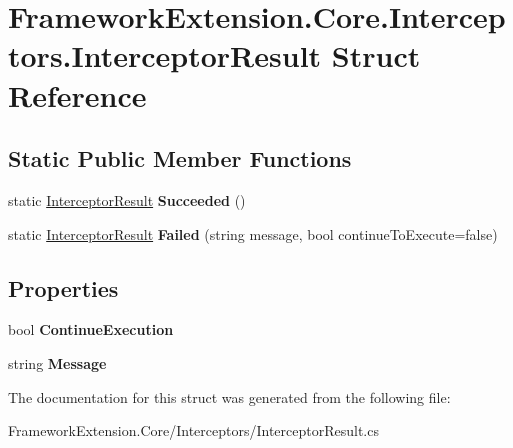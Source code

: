 \hypertarget{struct_framework_extension_1_1_core_1_1_interceptors_1_1_interceptor_result}{\section{Framework\-Extension.\-Core.\-Interceptors.\-Interceptor\-Result Struct Reference}
\label{struct_framework_extension_1_1_core_1_1_interceptors_1_1_interceptor_result}
}
\subsection*{Static Public Member Functions}
\begin{DoxyCompactItemize}
\item 
\hypertarget{struct_framework_extension_1_1_core_1_1_interceptors_1_1_interceptor_result_aad16e0d9771fab36488d440f4ddc4102}{static \hyperlink{struct_framework_extension_1_1_core_1_1_interceptors_1_1_interceptor_result}{Interceptor\-Result} {\bfseries Succeeded} ()}\label{struct_framework_extension_1_1_core_1_1_interceptors_1_1_interceptor_result_aad16e0d9771fab36488d440f4ddc4102}

\item 
\hypertarget{struct_framework_extension_1_1_core_1_1_interceptors_1_1_interceptor_result_a294a218afdce7ba0ff6849a851f45c4d}{static \hyperlink{struct_framework_extension_1_1_core_1_1_interceptors_1_1_interceptor_result}{Interceptor\-Result} {\bfseries Failed} (string message, bool continue\-To\-Execute=false)}\label{struct_framework_extension_1_1_core_1_1_interceptors_1_1_interceptor_result_a294a218afdce7ba0ff6849a851f45c4d}

\end{DoxyCompactItemize}
\subsection*{Properties}
\begin{DoxyCompactItemize}
\item 
\hypertarget{struct_framework_extension_1_1_core_1_1_interceptors_1_1_interceptor_result_a1fc3c9b79351c287b4daf4887f41f3fe}{bool {\bfseries Continue\-Execution}}\label{struct_framework_extension_1_1_core_1_1_interceptors_1_1_interceptor_result_a1fc3c9b79351c287b4daf4887f41f3fe}

\item 
\hypertarget{struct_framework_extension_1_1_core_1_1_interceptors_1_1_interceptor_result_a9a282901dd73c684539ccedd518ee6f4}{string {\bfseries Message}}\label{struct_framework_extension_1_1_core_1_1_interceptors_1_1_interceptor_result_a9a282901dd73c684539ccedd518ee6f4}

\end{DoxyCompactItemize}


The documentation for this struct was generated from the following file\-:\begin{DoxyCompactItemize}
\item 
Framework\-Extension.\-Core/\-Interceptors/Interceptor\-Result.\-cs\end{DoxyCompactItemize}
